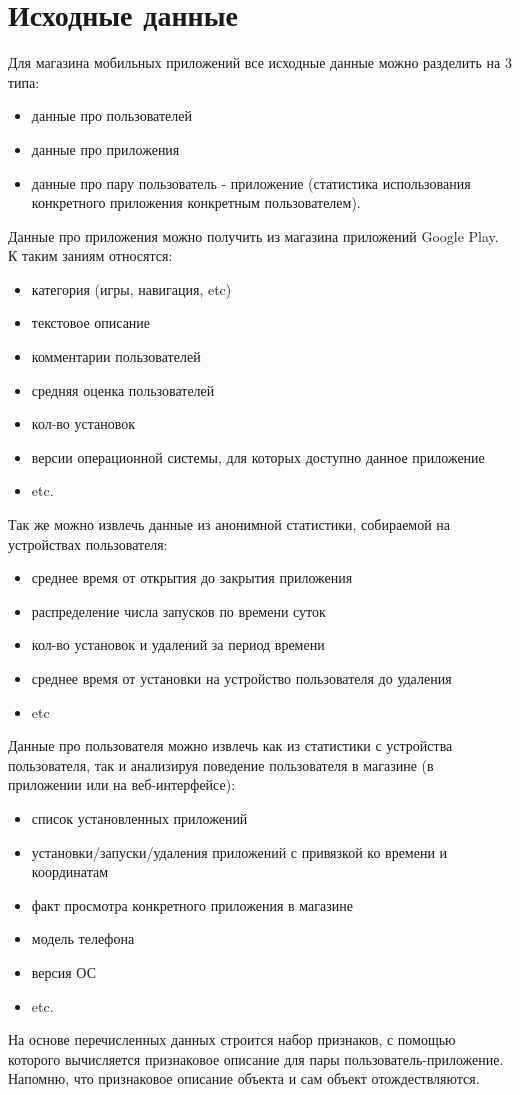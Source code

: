 \documentclass[12pt,a4paper]{report}
\begin{document}
\section{Исходные данные}
Для магазина мобильных приложений все исходные данные можно разделить на 3 типа:
\begin{itemize}
\item данные про пользователей
\item данные про приложения
\item данные про пару пользователь - приложение (статистика использования конкретного приложения конкретным пользователем).
\end{itemize}
Данные про приложения можно получить из магазина приложений Google Play. К таким заниям относятся:
\begin{itemize}
\item категория (игры, навигация, etc)
\item текстовое описание
\item комментарии пользователей
\item средняя оценка пользователей
\item кол-во установок
\item версии операционной системы, для которых доступно данное приложение
\item etc.
\end{itemize}
Так же можно извлечь данные из анонимной статистики, собираемой на устройствах пользователя:
\begin{itemize}
\item среднее время от открытия до закрытия приложения
\item распределение числа запусков по времени суток
\item кол-во установок и удалений за период времени
\item среднее время от установки на устройство пользователя до удаления
\item etc
\end{itemize}
Данные про пользователя можно извлечь как из статистики с устройства пользователя, так и анализируя поведение пользователя в магазине (в приложении или на веб-интерфейсе):
\begin{itemize}
\item список установленных приложений
\item установки/запуски/удаления приложений с привязкой ко времени и координатам
\item факт просмотра конкретного приложения в магазине
\item модель телефона
\item версия ОС
\item etc.
\end{itemize}
На основе перечисленных данных строится набор признаков, с помощью которого вычисляется признаковое описание для пары пользователь-приложение. Напомню, что признаковое описание объекта и сам объект отождествляются.
\end{document}
